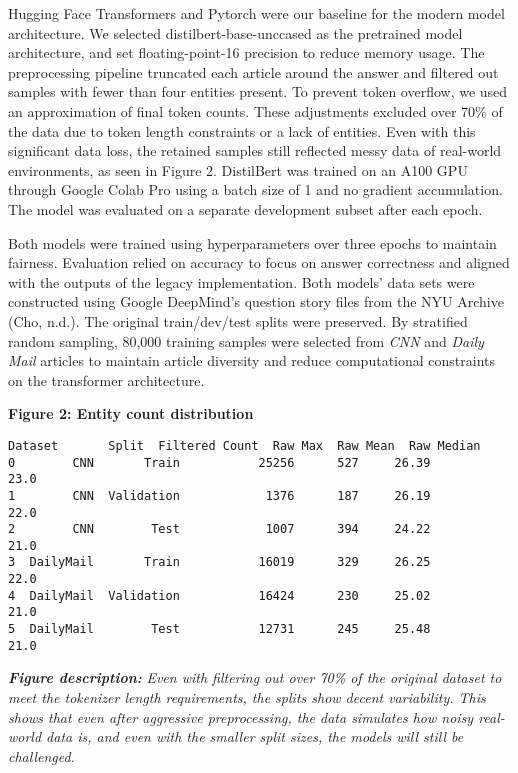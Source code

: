 \documentclass[11pt]{article}
\begin{document}
Hugging Face Transformers and Pytorch were our baseline for the modern
model architecture. We selected distilbert-base-unccased as the
pretrained model architecture, and set floating-point-16 precision to
reduce memory usage. The preprocessing pipeline truncated each article
around the answer and filtered out samples with fewer than four entities
present. To prevent token overflow, we used an approximation of final
token counts. These adjustments excluded over 70\% of the data due to
token length constraints or a lack of entities. Even with this
significant data loss, the retained samples still reflected messy data
of real-world environments, as seen in Figure 2. DistilBert was trained
on an A100 GPU through Google Colab Pro using a batch size of 1 and no
gradient accumulation. The model was evaluated on a separate development
subset after each epoch.

Both models were trained using hyperparameters over three epochs to
maintain fairness. Evaluation relied on accuracy to focus on answer
correctness and aligned with the outputs of the legacy implementation.
Both models' data sets were constructed using Google DeepMind's question
story files from the NYU Archive (Cho, n.d.). The original
train/dev/test splits were preserved. By stratified random sampling,
80,000 training samples were selected from \emph{CNN} and \emph{Daily
Mail} articles to maintain article diversity and reduce computational
constraints on the transformer architecture.

\begin{samepage}
	\begin{center}
		\textbf{Figure 2: Entity count distribution}
	\end{center}
    \begin{Verbatim}[commandchars=\\\{\}]
     Dataset       Split  Filtered Count  Raw Max  Raw Mean  Raw Median
0        CNN       Train           25256      527     26.39        23.0
1        CNN  Validation            1376      187     26.19        22.0
2        CNN        Test            1007      394     24.22        21.0
3  DailyMail       Train           16019      329     26.25        22.0
4  DailyMail  Validation           16424      230     25.02        21.0
5  DailyMail        Test           12731      245     25.48        21.0
    \end{Verbatim}
    \vspace{1em}
\noindent\begin{minipage}{0.9\linewidth}
\begin{scriptsize}
\textbf{\textit{Figure description:}} \textit{Even with filtering out over 70\% of the original dataset to meet the tokenizer length requirements, the splits show decent variability. This shows that even after aggressive preprocessing, the data simulates how noisy real-world data is, and even with the smaller split sizes, the models will still be challenged.}
\end{scriptsize}
\end{minipage}
\end{samepage}
\end{document}
